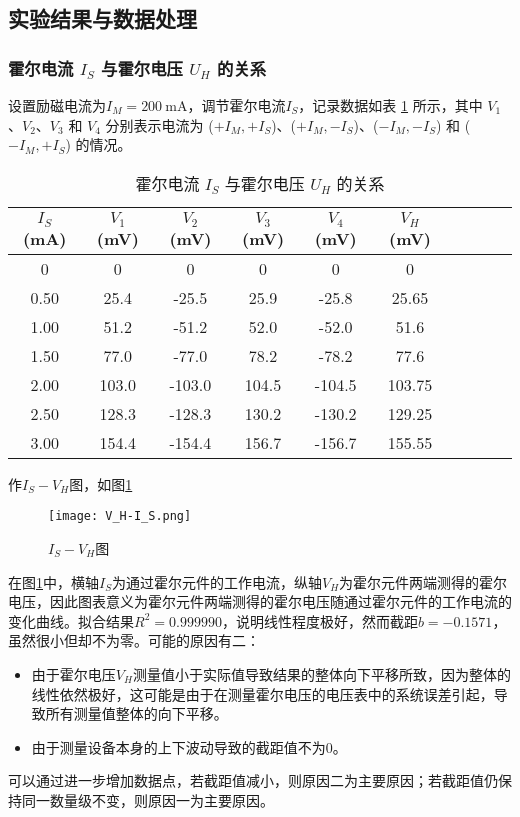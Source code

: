 \documentclass[11pt]{article}
\begin{document}
	
	\subsection{实验结果与数据处理}
	\subsubsection{霍尔电流 $ I_S $ 与霍尔电压 $ U_H $ 的关系}
	设置励磁电流为$ I_M= 200 \ \mathrm{mA} $，调节霍尔电流$ I_S $，记录数据如表 \ref{霍尔电流与霍尔电压的关系} 所示，其中 $V_1$、$V_2$、$V_3$ 和 $V_4$ 分别表示电流为 ($+I_M, +I_S$)、($+I_M, -I_S$)、($-I_M, -I_S$) 和 ($-I_M, +I_S$) 的情况。
	\begin{table}[H]\centering
		\caption{霍尔电流 $I_S$ 与霍尔电压 $U_H$ 的关系}
		\label{霍尔电流与霍尔电压的关系}
		\begin{tabular}{cccccccccc}\toprule
			$I_S$ (mA) & $V_1$ (mV)  & $V_2$ (mV)  & $V_3$ (mV)   & $V_4$ (mV)   & $V_H$ (mV)    \\
			\midrule
			0          & 0          & 0          & 0          & 0          & 0 \\
			0.50       & 25.4       & -25.5     & 25.9       & -25.8     & 25.65 \\
			1.00       & 51.2       & -51.2      & 52.0       & -52.0      & 51.6 \\
			1.50       & 77.0       & -77.0      & 78.2       & -78.2      & 77.6 \\
			2.00       & 103.0      & -103.0     & 104.5      & -104.5     & 103.75 \\
			2.50       & 128.3      & -128.3     & 130.2      & -130.2     & 129.25 \\
			3.00       & 154.4     & -154.4    & 156.7      & -156.7     & 155.55 \\
			\bottomrule
		\end{tabular}
	\end{table}
	
	作$I_S-V_H$图，如图\ref{fig:V_H-I_S}
	\begin{figure}[H]
		\centering
		\texttt{[image: V\_H-I\_S.png]}
		\caption{$I_S-V_H$图}
		\label{fig:V_H-I_S}
	\end{figure}
	
	在图\ref{fig:V_H-I_S}中，横轴$I_S$为通过霍尔元件的工作电流，纵轴$V_H$为霍尔元件两端测得的霍尔电压，因此图表意义为霍尔元件两端测得的霍尔电压随通过霍尔元件的工作电流的变化曲线。拟合结果$R^2=0.999990$，说明线性程度极好，然而截距$b=-0.1571$，虽然很小但却不为零。可能的原因有二：
	\begin{itemize}
		\item 由于霍尔电压$V_H$测量值小于实际值导致结果的整体向下平移所致，因为整体的线性依然极好，这可能是由于在测量霍尔电压的电压表中的系统误差引起，导致所有测量值整体的向下平移。
		\item 由于测量设备本身的上下波动导致的截距值不为0。
	\end{itemize}
	可以通过进一步增加数据点，若截距值减小，则原因二为主要原因；若截距值仍保持同一数量级不变，则原因一为主要原因。
	
\end{document}
